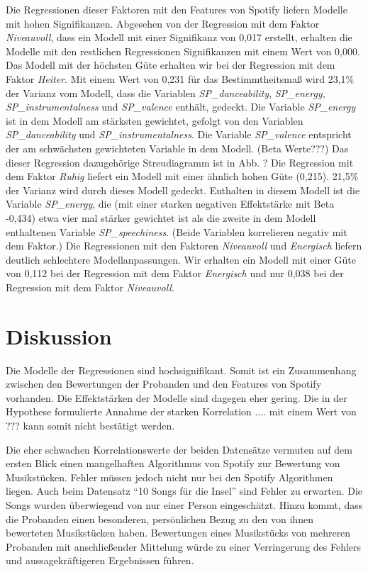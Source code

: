 Die Regressionen dieser Faktoren mit den Features von Spotify liefern Modelle mit hohen Signifikanzen. Abgesehen von der Regression mit dem Faktor \textit{Niveauvoll}, dass ein Modell mit einer Signifikanz von 0,017 erstellt, erhalten die Modelle mit den restlichen Regressionen Signifikanzen mit einem Wert von 0,000. 
Das Modell mit der höchsten Güte erhalten wir bei der Regression mit dem Faktor \textit{Heiter}.
Mit einem Wert von 0,231 für das Bestimmtheitsmaß wird 23,1\% der Varianz vom Modell, dass die Variablen \textit{SP\_danceability}, \textit{SP\_energy}, \textit{SP\_instrumentalness} und \textit{SP\_valence} enthält, gedeckt.
Die Variable \textit{SP\_energy} ist in dem Modell am stärksten gewichtet, gefolgt von den Variablen \textit{SP\_danceability} und \textit{SP\_instrumentalness}. Die Variable \textit{SP\_valence} entspricht der am schwächsten gewichteten Variable in dem Modell. (Beta Werte???)
Das dieser Regression dazugehörige Streudiagramm ist in Abb. ?   
Die Regression mit dem Faktor \textit{Ruhig} liefert ein Modell mit einer ähnlich hohen Güte (0,215).
21,5\% der Varianz wird durch dieses Modell gedeckt.
Enthalten in diesem Modell ist die Variable \textit{SP\_energy}, die (mit einer starken negativen Effektstärke mit Beta -0,434) etwa vier mal stärker gewichtet ist als die zweite in dem Modell enthaltenen Variable \textit{SP\_speechiness}.
(Beide Variablen korrelieren negativ mit dem Faktor.) 
Die  Regressionen mit den Faktoren \textit{Niveauvoll} und \textit{Energisch} liefern deutlich schlechtere Modellanpassungen.
Wir erhalten ein Modell mit einer Güte von 0,112 bei der Regression mit dem Faktor \textit{Energisch} und nur 0,038 bei der Regression mit dem Faktor \textit{Niveauvoll}.

\section*{Diskussion}
\label{sec:Diskussion}


Die Modelle der Regressionen sind hochsignifikant.
Somit ist ein Zusammenhang zwischen den Bewertungen der Probanden und den Features von Spotify vorhanden.
Die Effektstärken der Modelle sind dagegen eher gering.
Die in der Hypothese formulierte Annahme der starken Korrelation .... mit einem Wert von ??? kann somit nicht bestätigt werden.

Die eher schwachen Korrelationswerte der beiden Datensätze vermuten auf dem ersten Blick einen mangelhaften Algorithmus von Spotify zur Bewertung von Musikstücken.
Fehler müssen jedoch nicht nur bei den Spotify Algorithmen liegen.
Auch beim Datensatz ``10 Songs für die Insel'' sind Fehler zu erwarten.
Die Songs wurden überwiegend von nur einer Person eingeschätzt.
Hinzu kommt, dass die Probanden einen besonderen, persönlichen Bezug zu den von ihnen bewerteten Musikstücken haben.
Bewertungen eines Musikstücks von mehreren Probanden mit anschließender Mittelung würde zu einer Verringerung des Fehlers und aussagekräftigeren Ergebnissen führen.

